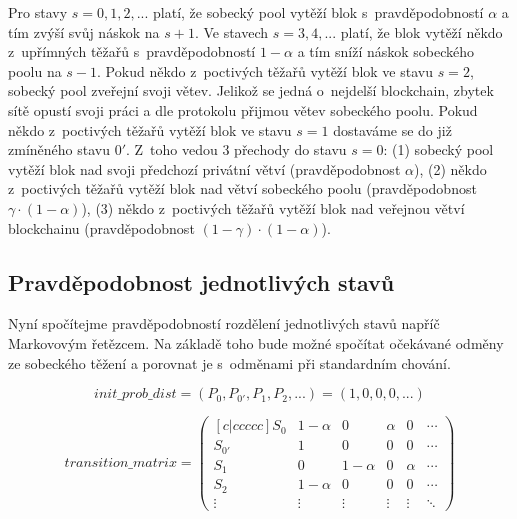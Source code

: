 Pro stavy $s = 0, 1, 2, ...$ platí, že sobecký pool vytěží blok s~pravděpodobností $\alpha$ a tím zvýší svůj náskok na $s + 1$. Ve stavech $s = 3, 4, ...$ platí, že blok vytěží někdo z~upřímných těžařů s~pravděpodobností $1 - \alpha$ a tím sníží náskok sobeckého poolu na $s - 1$. Pokud někdo z~poctivých těžařů vytěží blok ve stavu $s = 2$, sobecký pool zveřejní svoji větev. Jelikož se jedná o~nejdelší blockchain, zbytek sítě opustí svoji práci a dle protokolu přijmou větev sobeckého poolu. Pokud někdo z~poctivých těžařů vytěží blok ve stavu $s = 1$ dostaváme se do již zmíněného stavu $0'$. Z~toho vedou 3 přechody do stavu $s = 0$: (1) sobecký pool vytěží blok nad svoji předchozí privátní větví (pravděpodobnost $\alpha$), (2) někdo z~poctivých těžařů vytěží blok nad větví sobeckého poolu (pravděpodobnost $\gamma \cdot (1 - \alpha)$), (3) někdo z~poctivých těžařů vytěží blok nad veřejnou větví blockchainu (pravděpodobnost $(1 - \gamma) \cdot (1 - \alpha)$).


\subsection{Pravděpodobnost jednotlivých stavů}
\label{sec_analyza_pravdepodobnost}

Nyní spočítejme pravděpodobností rozdělení jednotlivých stavů napříč Markovovým řetězcem. Na základě toho bude možné spočítat očekávané odměny ze sobeckého těžení a porovnat je s~odměnami při standardním chování.

\begin{equation}
    init\_prob\_dist = (P_0, P_{0'}, P_1, P_2, ...) = (1, 0, 0, 0, ...)
    \label{eq_init_prob_dist}
\end{equation}

\begin{equation}
    transition\_matrix =
    \begin{pmatrix}[c|ccccc]
        S_0 & 1 - \alpha & 0 & \alpha & 0 & \cdots \\
        S_{0'} & 1 & 0 & 0 & 0 & \cdots \\
        S_1 & 0 & 1 - \alpha & 0 & \alpha & \cdots \\
        S_2 & 1 - \alpha & 0 & 0 & 0 & \cdots \\
        \vdots & \vdots & \vdots & \vdots & \vdots & \ddots
    \end{pmatrix}
    \label{eq_trans_mat}
\end{equation}

